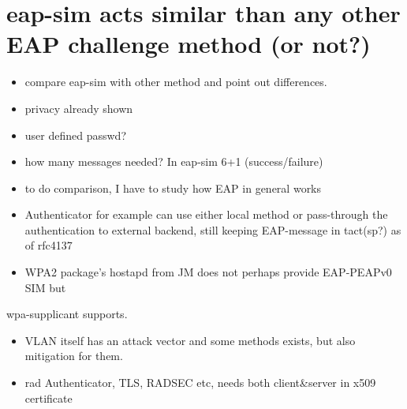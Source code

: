 \documentclass[12pt,a4paper,english]{tutthesis}
\begin{document}
\section{eap-sim acts similar than any other EAP challenge method (or not?)}
\label{sec-8-4}
\begin{itemize}
\item compare eap-sim with other method and point out differences.
\item privacy already shown
\item user defined passwd?
\item how many messages needed? In eap-sim 6+1 (success/failure)
\item to do comparison, I have to study how EAP in general works
\item Authenticator for example can use either local method or
pass-through the authentication to external backend, still keeping
EAP-message in tact(sp?) as of  rfc4137
\item WPA2 package's hostapd from JM does not perhaps provide EAP-PEAPv0 SIM but
\end{itemize}
wpa-supplicant supports.
\begin{itemize}
\item VLAN itself has an attack vector and some methods exists, but also
mitigation for them.
\item rad Authenticator, TLS, RADSEC etc, needs both client\&server in
x509 certificate
\end{itemize}
\end{document}
